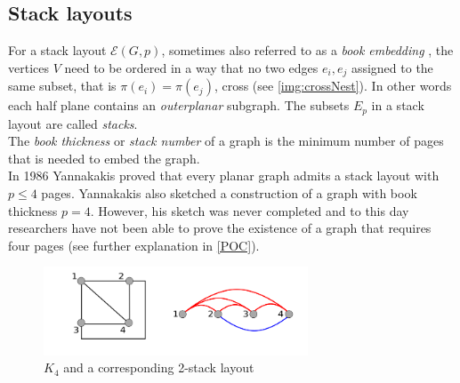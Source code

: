 \subsection{Stack layouts}
For a stack layout $\mathcal{E}(G,p)$, sometimes also referred to as a \textit{book embedding} , the vertices $V$ need to be ordered in a way that no two edges $e_i, e_j$ assigned to the same subset, that is $\pi(e_i) = \pi(e_j)$, cross (see \autoref{img:crossNest}). In other words each half plane contains an \textit{outerplanar} subgraph. The subsets $E_p$ in a stack layout are called \textit{stacks}.\\
The \textit{book thickness} or \textit{stack number}   of a graph is the minimum number of pages that is needed to embed the graph.\\
In 1986 Yannakakis \cite{yannakakis1986four} proved that every planar graph admits  a stack layout with $p \leq 4$ pages. Yannakakis also sketched a construction of a graph with book thickness $p = 4$. However, his sketch was never completed and to this day researchers have not been able to prove the existence of a graph that requires four pages (see further explanation in \autoref{POC}).
\begin{figure}[!h]
\begin{center}
\includegraphics[width=0.7\textwidth]{figures/K4Stack.png}
\caption{$K_4$ and a corresponding 2-stack layout}
\label{img:stackGHG}
\end{center}
\end{figure}
